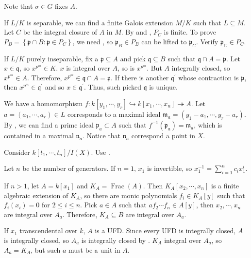 \begin{exercise}\label{ex5.14}
	Note that $\sigma\in G$ fixes $A$.
\end{exercise}

\begin{exercise}\label{ex5.15}
	If $L/K$ is separable, we can find a finite Galois extension $M/K$ such that $L\subseteq M$. Let $C$ be the integral closure of $A$ in $M$. By  and , $P_C$ is finite. To prove $P_B=\left\{\mathfrak{p}\cap B:\mathfrak{p}\in P_C\right\}$, we need , so $\mathfrak{p}_B\in P_B$ can be lifted to $\mathfrak{p}_C$. Verify $\mathfrak{p}_C\in P_C$.
	
	If $L/K$ purely inseparable, fix a $\mathfrak{p}\subseteq A$ and pick $\mathfrak{q}\subseteq B$ such that $\mathfrak{q}\cap A=\mathfrak{p}$. Let $x\in\mathfrak{q}$, so $x^{p^m}\in K$. $x$ is integral over $A$, so is $x^{p^m}$. But $A$ integrally closed, so $x^{p^m}\in A$. Therefore, $x^{p^m}\in\mathfrak{q}\cap A=\mathfrak{p}$. If there is another $\mathfrak{q}^\prime$ whose contraction is $\mathfrak{p}$, then $x^{p^m}\in\mathfrak{q}^\prime$ and so $x\in\mathfrak{q}^\prime$. Thus, such picked $\mathfrak{q}$ is unique.
\end{exercise}

\begin{exercise}\label{ex5.16}
	We have a homomorphism $f:k\left[y_1,\cdots,y_r\right]\hookrightarrow k\left[x_1,\cdots,x_n\right]\twoheadrightarrow  A$. Let $a=\left(a_1,\cdots,a_r\right)\in L$ corresponds to a maximal ideal $\mathfrak{m}_a=\left(y_1-a_1,\cdots,y_r-a_r\right)$. By , we can find a prime ideal $\mathfrak{p}_a\subset A$ such that $f^{-1}(\mathfrak{p}_a)=\mathfrak{m}_a$, which is contained in a maximal $\mathfrak{n}_a$. Notice that $\mathfrak{n}_a$ correspond a point in $X$.
\end{exercise}

\begin{exercise}\label{ex5.17}
	Consider $k\left[t_1,\cdots,t_n\right]/I(X)$. Use .
\end{exercise}

\begin{exercise}[\textcolor{red}{Zariski's lemma}]\label{ex5.18}
	Let $n$ be the number of generators. If $n=1$, $x_1$ is invertible, so $x_1^{-1}=\sum_{i=1}^nc_ix_1^i$.
	
	If $n>1$, let $A=k\left[x_1\right]$ and $K_A=\operatorname{Frac}(A)$. Then $K_A[x_2,\cdots,x_n]$ is a finite algebraic extension of $K_A$, so there are monic polynomials $f_i\in K_A[y]$ such that $f_i\left(x_i\right)=0$ for $2\leqslant i\leqslant n$. Pick $a\in A$ such that $af_2\cdots f_n\in A[y]$, then $x_2,\cdots,x_n$ are integral over $A_a$. Therefore, $K_A\subseteq B$ are integral over $A_a$.
	
	If $x_1$ transcendental over $k$, $A$ is a UFD. Since every UFD is integrally closed, $A$ is integrally closed, so $A_a$ is integrally closed by . $K_A$ integral over $A_a$, so $A_a=K_A$, but such $a$ must be a unit in $A$.
\end{exercise}

